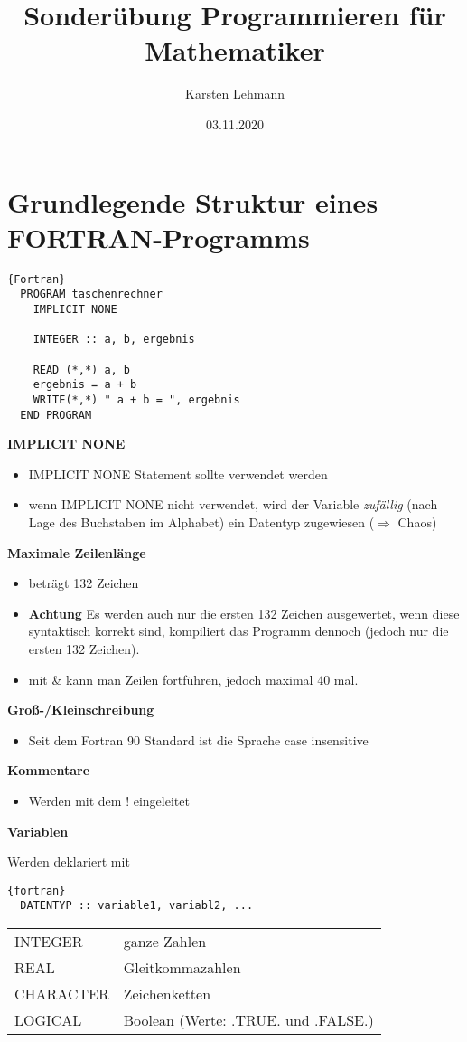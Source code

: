\documentclass{article}
\author{Karsten Lehmann}
\date{03.11.2020}
\title{Sonderübung Programmieren für Mathematiker}
\begin{document}
\maketitle
\newpage

\section*{Grundlegende Struktur eines FORTRAN-Programms}

\begin{lstlisting}{Fortran}
  PROGRAM taschenrechner
    IMPLICIT NONE

    INTEGER :: a, b, ergebnis

    READ (*,*) a, b
    ergebnis = a + b
    WRITE(*,*) " a + b = ", ergebnis
  END PROGRAM
\end{lstlisting}

\textbf{IMPLICIT NONE}
\begin{itemize}
\item IMPLICIT NONE Statement sollte verwendet werden
\item wenn IMPLICIT NONE nicht verwendet, wird der Variable \emph{zufällig} (nach Lage
  des Buchstaben im Alphabet) ein Datentyp zugewiesen ($\Rightarrow$ Chaos)
\end{itemize}

\textbf{Maximale Zeilenlänge}
\begin{itemize}
\item beträgt 132 Zeichen
\item \textbf{Achtung} Es werden auch nur die ersten 132 Zeichen ausgewertet, wenn diese syntaktisch korrekt sind,
  kompiliert das Programm dennoch (jedoch nur die ersten 132 Zeichen).
\item mit \& kann man Zeilen fortführen, jedoch maximal 40 mal.
\end{itemize}

\textbf{Groß-/Kleinschreibung}
\begin{itemize}
\item Seit dem Fortran 90 Standard ist die Sprache case insensitive
\end{itemize}

\textbf{Kommentare}
\begin{itemize}
\item Werden mit dem ! eingeleitet
\end{itemize}

\textbf{Variablen}

Werden deklariert mit

\begin{lstlisting}{fortran}
  DATENTYP :: variable1, variabl2, ...
\end{lstlisting}

\begin{tabular}{l l}
  INTEGER   & ganze Zahlen \\
  REAL      & Gleitkommazahlen \\
  CHARACTER & Zeichenketten \\
  LOGICAL & Boolean (Werte: .TRUE. und .FALSE.)\\
\end{tabular}
\end{document}
